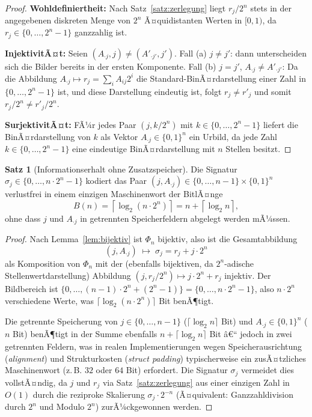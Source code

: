 ﻿\documentclass[a4paper,12pt]{article}
\theoremstyle{definition}
\newtheorem{satz}{Satz}
\begin{document}
\begin{proof}
	\textbf{Wohldefiniertheit:} Nach Satz~\ref{satz:zerlegung} liegt
	$r_j/2^n$ stets in der angegebenen diskreten Menge von $2^n$ Ã¤quidistanten
	Werten in $[0,1)$, da $r_j \in \{0,\ldots,2^n-1\}$ ganzzahlig ist.

	\textbf{InjektivitÃ¤t:} Seien $(A_{\cdot j}, j) \neq (A'_{\cdot j'}, j')$.
	Fall (a) $j \neq j'$: dann unterscheiden sich die Bilder bereits in der
	ersten Komponente. Fall (b) $j = j'$, $A_{\cdot j} \neq A'_{\cdot j'}$:
	Da die Abbildung $A_{\cdot j} \mapsto r_j = \sum_i A_{ij}2^i$ die
	Standard-BinÃ¤rdarstellung einer Zahl in $\{0,\ldots,2^n-1\}$ ist, und
	diese Darstellung eindeutig ist, folgt $r_j \neq r'_j$ und somit
	$r_j/2^n \neq r'_j/2^n$.

	\textbf{SurjektivitÃ¤t:} FÃ¼r jedes Paar $(j, k/2^n)$ mit
	$k\in\{0,\ldots,2^n-1\}$ liefert die BinÃ¤rdarstellung von $k$ als Vektor
	$A_{\cdot j} \in \{0,1\}^n$ ein Urbild, da jede Zahl $k \in \{0,\ldots,2^n-1\}$
	eine eindeutige BinÃ¤rdarstellung mit $n$ Stellen besitzt. \qedhere
\end{proof}

\begin{satz}[Informationserhalt ohne Zusatzspeicher]
\label{satz:infoerhalt}
	Die Signatur $\sigma_j \in \{0,\ldots,n\cdot 2^n - 1\}$ kodiert das Paar
	$(j, A_{\cdot j}) \in \{0,\ldots,n-1\}\times\{0,1\}^n$ verlustfrei in
	einem einzigen Maschinenwort der BitlÃ¤nge
	\[
		B(n) = \left\lceil \log_2(n\cdot 2^n) \right\rceil
		= n + \left\lceil \log_2 n \right\rceil,
	\]
	ohne dass $j$ und $A_{\cdot j}$ in getrennten Speicherfeldern abgelegt
	werden mÃ¼ssen.
\end{satz}

\begin{proof}
	Nach Lemma~\ref{lem:bijektiv} ist $\Phi_n$ bijektiv, also ist die
	Gesamtabbildung
	\[
		(j, A_{\cdot j}) \;\longmapsto\; \sigma_j = r_j + j\cdot 2^n
	\]
	als Komposition von $\Phi_n$ mit der (ebenfalls bijektiven, da
	$2^n$-adische Stellenwertdarstellung) Abbildung
	$(j, r_j/2^n) \mapsto j\cdot 2^n + r_j$ injektiv. Der Bildbereich ist
	$\{0,\ldots, (n-1)\cdot 2^n + (2^n-1)\} = \{0,\ldots,n\cdot2^n-1\}$, also
	$n\cdot 2^n$ verschiedene Werte, was $\lceil\log_2(n\cdot2^n)\rceil$ Bit
	benÃ¶tigt.

	Die getrennte Speicherung von $j\in\{0,\ldots,n-1\}$
	($\lceil\log_2 n\rceil$ Bit) und $A_{\cdot j}\in\{0,1\}^n$ ($n$ Bit)
	benÃ¶tigt in der Summe ebenfalls $n + \lceil\log_2 n\rceil$ Bit â€“ jedoch
	in zwei getrennten Feldern, was in realen Implementierungen wegen
	Speicherausrichtung (\emph{alignment}) und Strukturkosten
	(\emph{struct padding}) typischerweise ein zusÃ¤tzliches Maschinenwort
	(z.\,B. $32$ oder $64$ Bit) erfordert. Die Signatur $\sigma_j$ vermeidet
	dies vollstÃ¤ndig, da $j$ und $r_j$ via Satz~\ref{satz:zerlegung} aus
	einer einzigen Zahl in $O(1)$ durch die reziproke Skalierung
	$\sigma_j \cdot 2^{-n}$ (Ã¤quivalent: Ganzzahldivision durch $2^n$
	und Modulo $2^n$) zurÃ¼ckgewonnen werden. \qedhere
\end{proof}
\end{document}
